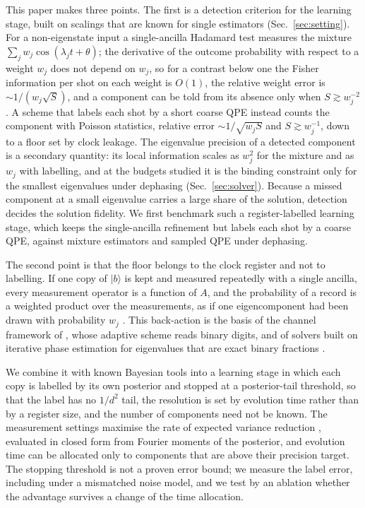 \documentclass[journal]{IEEEtran}
\begin{document}
This paper makes three points. The first is a detection criterion for the learning stage, built on scalings that are known for single estimators (Sec.~\ref{sec:setting}). For a non-eigenstate input a single-ancilla Hadamard test measures the mixture $\sum_jw_j\cos(\lambda_jt+\theta)$; the derivative of the outcome probability with respect to a weight $w_j$ does not depend on $w_j$, so for a contrast below one the Fisher information per shot on each weight is $O(1)$, the relative weight error is $\sim1/(w_j\sqrt S)$, and a component can be told from its absence only when $S\gtrsim w_j^{-2}$. A scheme that labels each shot by a short coarse QPE instead counts the component with Poisson statistics, relative error $\sim1/\sqrt{w_jS}$ and $S\gtrsim w_j^{-1}$, down to a floor set by clock leakage. The eigenvalue precision of a detected component is a secondary quantity: its local information scales as $w_j^2$ for the mixture and as $w_j$ with labelling, and at the budgets studied it is the binding constraint only for the smallest eigenvalues under dephasing (Sec.~\ref{sec:solver}). Because a missed component at a small eigenvalue carries a large share of the solution, detection decides the solution fidelity. We first benchmark such a register-labelled learning stage, which keeps the single-ancilla refinement but labels each shot by a coarse QPE, against mixture estimators and sampled QPE under dephasing.

The second point is that the floor belongs to the clock register and not to labelling. If one copy of $|b\rangle$ is kept and measured repeatedly with a single ancilla, every measurement operator is a function of $A$, and the probability of a record is a weighted product over the measurements, as if one eigencomponent had been drawn with probability $w_j$ \cite{OBrien2019}. This back-action is the basis of the channel framework of \cite{Jin2023}, whose adaptive scheme reads binary digits, and of solvers built on iterative phase estimation for eigenvalues that are exact binary fractions \cite{Gao2021}.

We combine it with known Bayesian tools into a learning stage in which each copy is labelled by its own posterior and stopped at a posterior-tail threshold, so that the label has no $1/d^2$ tail, the resolution is set by evolution time rather than by a register size, and the number of components need not be known. The measurement settings maximise the rate of expected variance reduction \cite{deNeeve2025,McMichael2021}, evaluated in closed form from Fourier moments of the posterior, and evolution time can be allocated only to components that are above their precision target. The stopping threshold is not a proven error bound; we measure the label error, including under a mismatched noise model, and we test by an ablation whether the advantage survives a change of the time allocation.
\end{document}
